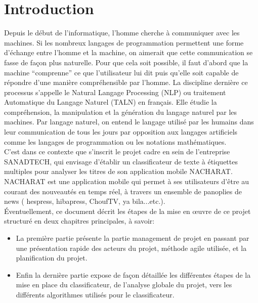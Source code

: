 \chapter*{Introduction}

Depuis le début de l’informatique, l’homme cherche à communiquer avec les machines. Si les nombreux langages de programmation permettent une forme d’échange entre l’homme et la machine, on aimerait que cette communication se fasse de façon plus naturelle. Pour que cela soit possible, il faut d’abord que la machine “comprenne” ce que l’utilisateur lui dit puis qu’elle soit capable de répondre d’une manière compréhensible par l’homme. La discipline dernière ce processus s’appelle le Natural Langage Processing (NLP) ou traitement Automatique du Langage Naturel (TALN) en français. Elle étudie la compréhension, la manipulation et la génération du langage naturel par les machines. Par langage naturel, on entend le langage utilisé par les humains dans leur communication de tous les jours par opposition aux langages artificiels comme les langages de programmation ou les notations mathématiques.\\
C'est dans ce contexte que s'inscrit le projet cadre en sein de l'entreprise SANADTECH, qui envisage d'établir un classificateur de texte à étiquettes multiples pour analyser les titres de son application mobile NACHARAT.\\
NACHARAT est une application mobile qui permet à ses utilisateurs d'être au courant des nouveautés en temps réel, à travers un ensemble de panoplies de news ( hespress, hibapress, ChoufTV, ya bila...etc.).\\ 
Éventuellement, ce document décrit les étapes de la mise en œuvre de ce projet structuré en deux chapitres principales, à savoir:

\begin{itemize}
\item La première partie présente la partie management de projet en passant par une présentation rapide des acteurs du projet, méthode agile utilisée, et la planification du projet.
\item Enfin la dernière partie expose de façon détaillée les différentes étapes de la mise en place du classificateur, de l'analyse globale du projet, vers les différents algorithmes utilisés pour le classificateur.
\end{itemize}